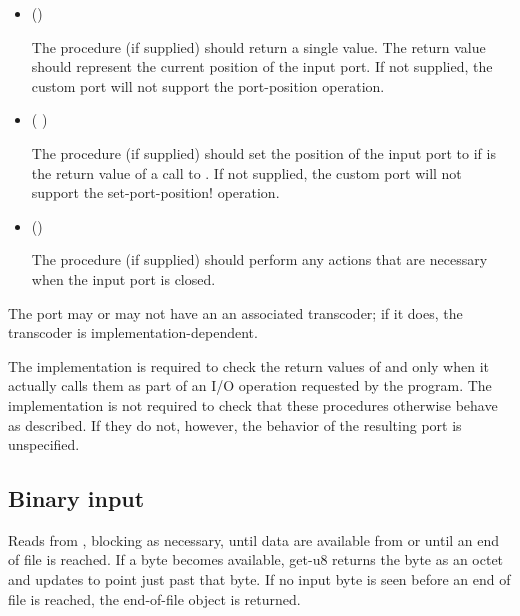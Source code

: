 \begin{entry}{%
}
\begin{itemize}
\item {\cf ()}
       
  The  procedure (if supplied) should return a single
  value.  The return value should represent the current position of
  the input port.  If not supplied, the custom port will not support
  the {\cf port-position} operation.
  
\item {\cf ( )}
       
  The  procedure (if supplied) should set the
  position of the input port to  if  is the return
  value of a call to .  If not supplied, the custom
  port will not support the {\cf set-port-position!} operation.
       
\item {\cf ()}
       
  The  procedure (if supplied) should perform any actions
  that are necessary when the input port is closed.
\end{itemize}

The port may or may not have an an associated transcoder; if it does,
the transcoder is implementation-dependent.

\implresp The implementation is required to check the return
values of  and  only when it actually calls
them as part of an I/O operation requested by the program.  The
implementation is not required to check that these procedures
otherwise behave as described.  If they do not, however, the behavior
of the resulting port is unspecified.
\end{entry}

\subsection{Binary input}

\begin{entry}{%
}
   
Reads from , blocking as necessary, until data are
available from  or until an end of file is reached.
If a byte becomes available, {\cf get-u8} returns the byte as an octet and
updates  to point just past that byte. If no input
byte is seen before an end of file is reached, the end-of-file
object is returned.
\end{entry}


